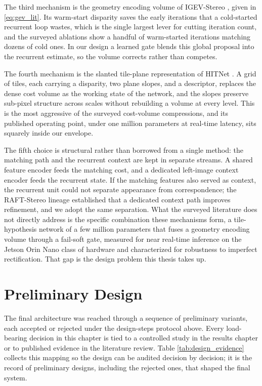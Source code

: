 The third mechanism is the geometry encoding volume of IGEV-Stereo
\cite{xu2023igev}, given in \eqref{eq:gev_lit}. Its warm-start disparity
saves the early iterations that a cold-started recurrent loop wastes,
which is the single largest lever for cutting iteration count, and the
surveyed ablations show a handful of warm-started iterations matching
dozens of cold ones. In our design a learned gate blends this global
proposal into the recurrent estimate, so the volume corrects rather than
competes.

The fourth mechanism is the slanted tile-plane representation of HITNet
\cite{tankovich2021hitnet}. A grid of tiles, each carrying a disparity,
two plane slopes, and a descriptor, replaces the dense cost volume as the
working state of the network, and the slopes preserve sub-pixel structure
across scales without rebuilding a volume at every level. This is the
most aggressive of the surveyed cost-volume compressions, and its
published operating point, under one million parameters at real-time
latency, sits squarely inside our envelope.

The fifth choice is structural rather than borrowed from a single method:
the matching path and the recurrent context are kept in separate streams.
A shared feature encoder feeds the matching cost, and a dedicated
left-image context encoder feeds the recurrent state. If the matching
features also served as context, the recurrent unit could not separate
appearance from correspondence; the RAFT-Stereo lineage
\cite{lipson2021raftstereo} established that a dedicated context path
improves refinement, and we adopt the same separation. What the surveyed
literature does not directly address is the specific combination these
mechanisms form, a tile-hypothesis network of a few million parameters
that fuses a geometry encoding volume through a fail-soft gate, measured
for near real-time inference on the Jetson Orin Nano class of hardware
and characterized for robustness to imperfect rectification. That gap is
the design problem this thesis takes up.

\FloatBarrier
\section{Preliminary Design}
The final architecture was reached through a sequence of preliminary
variants, each accepted or rejected under the design-steps protocol
above. Every load-bearing decision in this chapter is tied to a
controlled study in the results chapter or to published evidence in the
literature review. Table \ref{tab:design_evidence} collects this mapping
so the design can be audited decision by decision; it is the record of
preliminary designs, including the rejected ones, that shaped the final
system.

